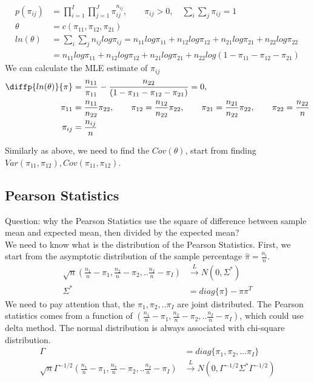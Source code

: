 \documentclass[11pt]{article} %
\begin{document}
	\begin{align*}
		p(\pi_{ij}) &= \prod_{i=1}^I \prod_{j=1}^J \pi_{ij}^{n_{ij}}, \qquad \pi_{ij} >0, \quad \sum_{i}\sum_{j} \pi_{ij} = 1 \\
		\theta &= c(\pi_{11}, \pi_{12}, \pi_{21})\\
		ln(\theta) &=  \sum_{i}\sum_{j} n_{ij} log \pi_{ij} = n_{11} log\pi_{11} + n_{12} log \pi_{12} + n_{21} log \pi_{21} + n_{22} log \pi_{22}\\
		&= n_{11} log \pi_{11} + n_{12} log \pi_{12} + n_{21} log \pi_{21} + n_{22} log (1- \pi_{11} - \pi_{12} - \pi_{21})
	\end{align*}
	We can calculate the MLE estimate of $\pi_{ij}$ 
	\begin{align*}
		\diffp{ln(\theta)}{\pi} &=  \frac{n_{11}}{\pi_{11}} - \frac{n_{22}}{(1- \pi_{11} - \pi_{12} - \pi_{21})} = 0, \\
		\qquad \pi_{11} &= \frac{n_{11}}{n_{22}}\pi_{22}, \qquad  \pi_{12} = \frac{n_{12}}{n_{22}}\pi_{22}, \qquad \pi_{21} = \frac{n_{21}}{n_{22}}\pi_{22}, \qquad \pi_{22} = \frac{n_{22}}{n}\\
	\pi_{ij} &= \frac{n_{ij}}{n}
	\end{align*}

	Similarly as above, we need to find the $Cov(\theta)$, start from finding $Var(\pi_{11}, \pi_{12}), Cov(\pi_{11}, \pi_{12})$.

	\subsection{Pearson Statistics}
	Question: why the Pearson Statistics use the square of difference between sample mean and expected mean, then divided by the expected mean? \\
	
	We need to know what is the distribution of the Pearson Statistics. First, we start from the asymptotic distribution of the sample percentage $\hat{\pi} = \frac{n_i}{n}$.
	\begin{align*}
		\sqrt{n} (\frac{n_1}{n} - \pi_1, \frac{n_2}{n} - \pi_2, ..\frac{n_I}{n}-\pi_I) & \xrightarrow{L} N(0, \Sigma^{\ast})\\
		\Sigma^{\ast} &= diag\{ \pi\} - \pi \pi^T
	\end{align*}
We need to pay attention that, the $\pi_1, \pi_2, .. \pi_I$ are joint distributed. The Pearson statistics comes from a function of $(\frac{n_1}{n} - \pi_1, \frac{n_2}{n} - \pi_2, ..\frac{n_I}{n}-\pi_I)$, which could use delta method. The normal distribution is always associated with chi-square distribution. \\
	\begin{align*}
		\Gamma &= diag\{ \pi_1, \pi_2,... \pi_I \} \\
		\sqrt{n} \Gamma^{-1/2} \left(\frac{n_1}{n} - \pi_1, \frac{n_2}{n} - \pi_2, ..\frac{n_I}{n}-\pi_I \right) & \xrightarrow{L} N(0, \Gamma^{-1/2} \Sigma^{\ast} \Gamma^{-1/2})
	\end{align*}
	
\end{document}

